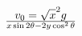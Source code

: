 \documentclass[preview]{standalone}
\begin{document}
\begin{align*}
v_0 = \sqrt x^2g} \over {x\sin 2\theta -2y\cos^2\theta
\end{align*}
\end{document}
